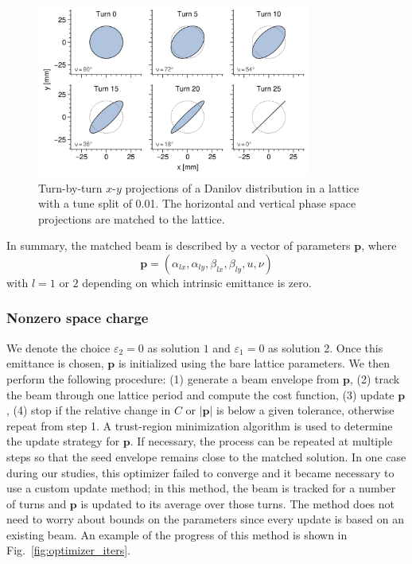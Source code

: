 \begin{figure}[!p]
    \centering
    \includegraphics[width=0.8\textwidth]{Images/chapter2/splittunes_tbt.png}
    \caption{Turn-by-turn $x$-$y$ projections of a Danilov distribution in a lattice with a tune split of 0.01. The horizontal and vertical phase space projections are matched to the lattice.}
    \label{fig:splittunes_tbt}
\end{figure}
%
In summary, the matched beam is described by a vector of parameters $\mathbf{p}$, where
%
\begin{equation} \label{eq:twiss_params_4D}
    \mathbf{p} = (\alpha_{lx}, \alpha_{ly}, \beta_{lx}, \beta_{ly}, u, \nu)
\end{equation}
%
with $l = 1$ or $2$ depending on which intrinsic emittance is zero.



\subsubsection{Nonzero space charge}

We denote the choice $\varepsilon_2 = 0$ as solution $1$ and $\varepsilon_1 = 0$ as solution 2. Once this emittance is chosen, $\mathbf{p}$ is initialized using the bare lattice parameters. We then perform the following procedure: (1) generate a beam envelope from $\mathbf{p}$, (2) track the beam through one lattice period and compute the cost function, (3) update $\mathbf{p}$, (4) stop if the relative change in $C$ or $|\mathbf{p}|$ is below a given tolerance, otherwise repeat from step 1. A trust-region minimization algorithm \cite{Branch1999} is used to determine the update strategy for $\mathbf{p}$. If necessary, the process can be repeated at multiple steps so that the seed envelope remains close to the matched solution. In one case during our studies, this optimizer failed to converge and it became necessary to use a custom update method; in this method, the beam is tracked for a number of turns and $\mathbf{p}$ is updated to its average over those turns. The method does not need to worry about bounds on the parameters since every update is based on an existing beam. An example of the progress of this method is shown in Fig.~\ref{fig:optimizer_iters}. 

